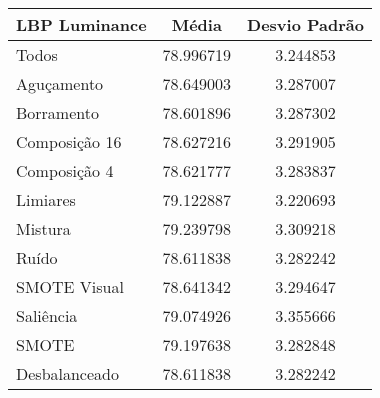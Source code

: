 

\begin{table}[!htbp]
\centering
\caption{}
\label{tab:resultados:x:melhor}
\begin{tabular}{|l|c|c|}
\hline
\textbf{LBP Luminance} & \textbf{Média}     & \textbf{Desvio Padrão} \\ \hline
   Todos        &  78.996719 &  3.244853  \\ \hline
  Aguçamento    &  78.649003 &  3.287007  \\ \hline
  Borramento    &  78.601896 &  3.287302  \\ \hline
  Composição 16 &  78.627216 &  3.291905  \\ \hline
  Composição 4  &  78.621777 &  3.283837  \\ \hline
  Limiares      &  79.122887 &  3.220693  \\ \hline
  Mistura       &  79.239798 &  3.309218  \\ \hline
  Ruído         &  78.611838 &  3.282242  \\ \hline
  SMOTE Visual  &  78.641342 &  3.294647  \\ \hline
  Saliência     &  79.074926 &  3.355666  \\ \hline
 SMOTE          &  79.197638 &  3.282848  \\ \hline
Desbalanceado   &  78.611838 &  3.282242  \\ \hline
\end{tabular}
\end{table}

